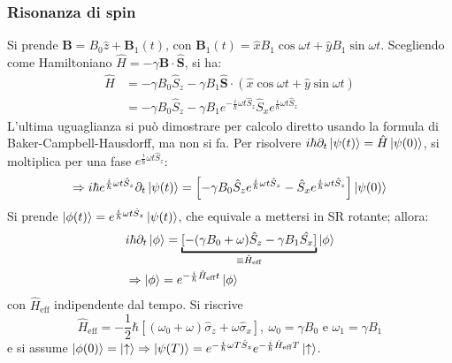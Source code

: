\documentclass[11pt, a4paper]{scrartcl} %
\numberwithin{equation}{subsection}
\theoremstyle{style2}
\theoremstyle{style1}
\begin{document}
\subsubsection{Risonanza di spin}\label{mag2liv}
Si prende $\mathbf{B}  = B_0 \hat{z} + \mathbf{B} _1 (t)$, con $\mathbf{B} _1(t) = \hat{x}B_1\cos \omega t + \hat{y} B_1 \sin \omega t$. 
Scegliendo come Hamiltoniano $\hat{H}= - \gamma \mathbf{B} \cdot \hat{\mathbf{S} }$, si ha:
\begin{equation}
	\begin{split}
		\hat{H} &= -\gamma B_0 \hat{S}_z - \gamma B_1 \hat{\mathbf{S} }\cdot  ( \hat{x} \cos \omega t + \hat{y} \sin  \omega t)\\
			&= - \gamma B_0 \hat{S}_z - \gamma B_1 e^{ - \frac{i}{\hbar }\omega t \hat{S}_z}  \hat{S}_x e^{\frac{i}{\hbar }\omega t \hat{S}_z} 
	\end{split}
\end{equation}
L'ultima uguaglianza si pu\`o dimostrare per calcolo diretto usando la formula di Baker-Campbell-Hausdorff, ma non si fa. Per risolvere $i\hbar  \partial _t \ket{\psi (t)}  = \hat{H}\ket{\psi (0)} $, si moltiplica per una fase $e^{ \frac{i}{\hbar }\omega t \hat{S}_z} $:
\[
\Rightarrow i\hbar e^{\frac{i}{\hbar }\omega t \hat{S}_z} \partial _t \ket{\psi (t)}  = \left[ - \gamma B_0 \hat{S}_z e^{\frac{i}{\hbar }\omega t \hat{S}_z}  - \hat{S}_x e^{\frac{i}{\hbar }\omega t \hat{S}_z} \right] \ket{\psi (0)} 
\] 
Si prende $\ket{\phi (t)} = e^{\frac{i}{\hbar }\omega t \hat{S}_z} \ket{\psi (t)} $, che equivale a mettersi in SR rotante; allora:
\begin{equation}
	\begin{split}
		&i\hbar  \partial _t \ket{\phi } = \underbracket{[- (\gamma B_0 + \omega)\hat{S}_z - \gamma B_1 \hat{S_x}]}_{\equiv \hat{H}_\text{eff}} \ket{\phi } \\
		&\Rightarrow \ket{\phi } = e^{ -\frac{i}{\hbar }\hat{H}_\text{eff}t} \ket{\phi } 
	\end{split}
\end{equation}
con $\hat{H}_\text{eff}$ indipendente dal tempo. Si riscrive
\begin{equation}
	\hat{H}_\text{eff} = - \frac{1}{2} \hbar \left[ (\omega_0 + \omega) \hat{\sigma }_z + \omega \hat{\sigma }_x \right] , \ \omega_0 = \gamma B_0 \text{ e } \omega _1 = \gamma B_1
\end{equation}
e si assume $\ket{\phi (0)} = \ket{\uparrow} \Rightarrow \ket{\psi (T)} = e^{- \frac{i}{\hbar }\omega T \hat{S}_z} e^{- \frac{i}{\hbar } \hat{H}_\text{eff}T} \ket{\uparrow}  $.
\end{document}
